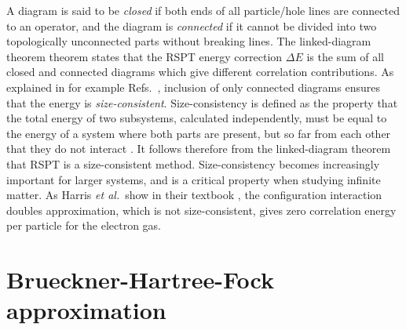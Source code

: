 \documentclass[a4paper,12pt]{report}
\begin{document}
A diagram is said to be \emph{closed} if both ends of all particle/hole 
lines are connected to an operator, and the diagram is \emph{connected} 
if it cannot be divided into two topologically unconnected parts without 
breaking lines. The linked-diagram theorem theorem \cite{goldstone1957} 
states that the RSPT energy correction $\Delta E$ is the sum of all 
closed and connected diagrams which give different correlation 
contributions. As explained in for example Refs.~\cite{harris,bartlett_book}, 
inclusion of only connected diagrams ensures that the energy is 
\emph{size-consistent}. Size-consistency is defined as the property 
that the total energy of two subsystems, calculated independently, 
must be equal to the energy of a system where both parts are present, 
but so far from each other that they do not interact \cite{bartlett_book}. 
It follows therefore from the linked-diagram theorem that RSPT 
is a size-consistent method. Size-consistency becomes increasingly important
for larger systems, and is a critical property when studying 
infinite matter. As Harris \emph{et al.}~show in their textbook 
\cite{harris}, the configuration interaction doubles approximation, 
which is not size-consistent, gives zero correlation energy per particle 
for the electron gas. 
 



\section{Brueckner-Hartree-Fock approximation}
\end{document}

